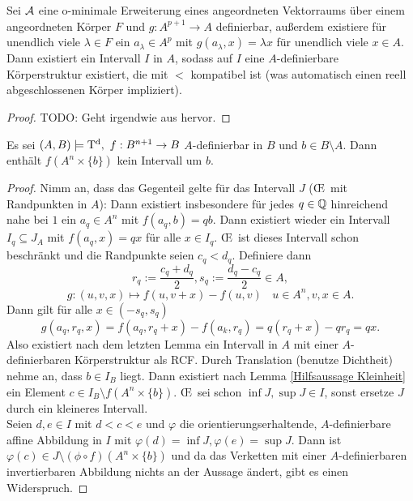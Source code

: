\begin{lemma}
	Sei $\mathcal{A}$ eine o-minimale Erweiterung eines angeordneten Vektorraums über einem angeordneten Körper $F$ und $g:A^{p+1}\rightarrow A$ definierbar, außerdem existiere für unendlich viele $\lambda\in F$ ein $a_\lambda\in A^p$ mit $g(a_\lambda,x)=\lambda x$ für unendlich viele $x\in A$. Dann existiert ein Intervall $I$ in $A$, sodass auf $I$ eine $A$-definierbare Körperstruktur existiert, die mit $<$ kompatibel ist (was automatisch einen reell abgeschlossenen Körper impliziert).
\end{lemma}
\begin{proof}
	TODO: Geht irgendwie aus \cite{PeterStarch} hervor.
\end{proof}

\begin{lemma}
	Es sei $(A,B)\models\td,\ f:B^{n+1}\rightarrow B$ $A$-definierbar in $B$ und $b\in B\setminus A$. Dann enthält $f(A^n\times\{b\})$ kein Intervall um $b$.
\end{lemma}
\begin{proof}
	Nimm an, dass das Gegenteil gelte für das Intervall $J$ (\OE\ mit Randpunkten in $A$): Dann existiert insbesondere für jedes $q\in\mathbb{Q}$ hinreichend nahe bei $1$ ein $a_q\in A^n$ mit $f(a_q,b)=qb$. Dann existiert wieder ein Intervall $I_q\subseteq J_A$ mit $f(a_q,x)=qx$ für alle $x\in I_q$. \OE\ ist dieses Intervall schon beschränkt und die Randpunkte seien $c_q<d_q$. Definiere dann $$r_q:=\frac{c_q+d_q}{2},s_q:=\frac{d_q-c_q}{2}\in A,$$ $$g:(u,v,x)\mapsto f(u,v+x)-f(u,v)\ \ \ \ u\in A^n,v,x\in A.$$
	Dann gilt für alle $x\in(-s_q,s_q)$ $$g(a_q,r_q,x)=f(a_q,r_q+x)-f(a_k,r_q)=q(r_q+x)-qr_q=qx.$$
	Also existiert nach dem letzten Lemma ein Intervall in $A$ mit einer $A$-definierbaren Körperstruktur als RCF. Durch Translation (benutze Dichtheit) nehme an, dass $b\in I_B$ liegt. Dann existiert nach Lemma \ref{Hilfsaussage Kleinheit} ein Element $c\in I_B\setminus f(A^n\times\{b\})$. \OE\ sei schon $\inf J,\sup J\in I$, sonst ersetze $J$ durch ein kleineres Intervall.\\
	Seien $d,e\in I$ mit $d<c<e$ und $\varphi$ die orientierungserhaltende, $A$-definierbare affine Abbildung in $I$ mit $\varphi(d)=\inf J,\varphi(e)=\sup J$. Dann ist $\varphi(c)\in J\setminus(\phi\circ f)(A^n\times\{b\})$ und da das Verketten mit einer $A$-definierbaren invertierbaren Abbildung nichts an der Aussage ändert, gibt es einen Widerspruch.
\end{proof}

\newpage

